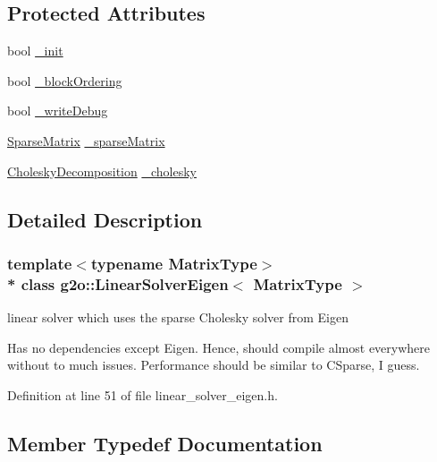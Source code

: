 \subsection*{Protected Attributes}
\begin{DoxyCompactItemize}
\item 
bool \hyperlink{classg2o_1_1LinearSolverEigen_a52c02e9b24e4f6ade190e6adb29b05b4}{\+\_\+init}
\item 
bool \hyperlink{classg2o_1_1LinearSolverEigen_a041970f37a5a6e63778f0c40e7c6e948}{\+\_\+block\+Ordering}
\item 
bool \hyperlink{classg2o_1_1LinearSolverEigen_a2d331575853451fc94ca6f6420f0bdcb}{\+\_\+write\+Debug}
\item 
\hyperlink{classg2o_1_1LinearSolverEigen_aeb7e2400bed3a249b5f29ce7cc00cd33}{Sparse\+Matrix} \hyperlink{classg2o_1_1LinearSolverEigen_a39682995a9cf32dc79848281c6d4d9b9}{\+\_\+sparse\+Matrix}
\item 
\hyperlink{classg2o_1_1LinearSolverEigen_1_1CholeskyDecomposition}{Cholesky\+Decomposition} \hyperlink{classg2o_1_1LinearSolverEigen_ab7205de4c6820b3ecd7ed7f39bbdf573}{\+\_\+cholesky}
\end{DoxyCompactItemize}


\subsection{Detailed Description}
\subsubsection*{template$<$typename Matrix\+Type$>$\\*
class g2o\+::\+Linear\+Solver\+Eigen$<$ Matrix\+Type $>$}

linear solver which uses the sparse Cholesky solver from Eigen 

Has no dependencies except Eigen. Hence, should compile almost everywhere without to much issues. Performance should be similar to C\+Sparse, I guess. 

Definition at line 51 of file linear\+\_\+solver\+\_\+eigen.\+h.



\subsection{Member Typedef Documentation}

